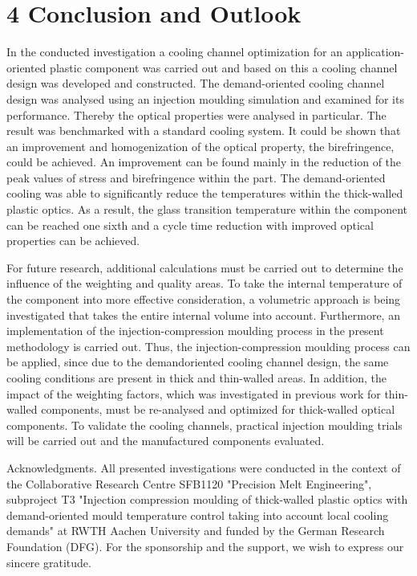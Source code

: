 \documentclass[10pt]{article}
\begin{document}
\section*{4 Conclusion and Outlook}
In the conducted investigation a cooling channel optimization for an application-oriented plastic component was carried out and based on this a cooling channel design was developed and constructed. The demand-oriented cooling channel design was analysed using an injection moulding simulation and examined for its performance. Thereby the optical properties were analysed in particular. The result was benchmarked with a standard cooling system. It could be shown that an improvement and homogenization of the optical property, the birefringence, could be achieved. An improvement can be found mainly in the reduction of the peak values of stress and birefringence within the part. The demand-oriented cooling was able to significantly reduce the temperatures within the thick-walled plastic optics. As a result, the glass transition temperature within the component can be reached one sixth and a cycle time reduction with improved optical properties can be achieved.

For future research, additional calculations must be carried out to determine the influence of the weighting and quality areas. To take the internal temperature of the component into more effective consideration, a volumetric approach is being investigated that takes the entire internal volume into account. Furthermore, an implementation of the injection-compression moulding process in the present methodology is carried out. Thus, the injection-compression moulding process can be applied, since due to the demandoriented cooling channel design, the same cooling conditions are present in thick and thin-walled areas. In addition, the impact of the weighting factors, which was investigated in previous work for thin-walled components, must be re-analysed and optimized for thick-walled optical components. To validate the cooling channels, practical injection moulding trials will be carried out and the manufactured components evaluated.

Acknowledgments. All presented investigations were conducted in the context of the Collaborative Research Centre SFB1120 "Precision Melt Engineering", subproject T3 "Injection compression moulding of thick-walled plastic optics with demand-oriented mould temperature control taking into account local cooling demands" at RWTH Aachen University and funded by the German Research Foundation (DFG). For the sponsorship and the support, we wish to express our sincere gratitude.
\end{document}
